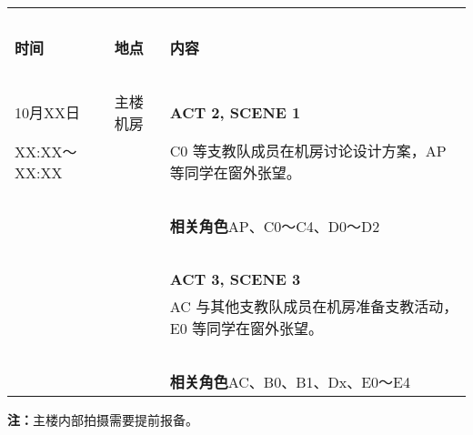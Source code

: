 \documentclass[10pt, a5paper, oneside]{memoir}
\begin{document}
\begin{table}[!ht]
    \raggedright
    \begin{tabular}{p{}p{}p{}}
        \toprule
        ~ & & \\[-0.7em]
        \textbf{时间} & \textbf{地点} & \textbf{内容} \\[0.3em]
        \midrule
        ~ & & \\[-0.7em]
        10月XX日        & 主楼机房 & \textbf{ACT 2, SCENE 1} \\[0.3em]
        XX:XX～XX:XX    & ~ & 
            C0 等支教队成员在机房讨论设计方案，AP 等同学在窗外张望。 
        \\
        ~ & & \\[-0.7em]
        ~ & ~ & \textbf{相关角色\quad}AP、C0～C4、D0～D2 \\[0.3em]
        ~ & & \\[-0.7em]
        ~ & ~ & \textbf{ACT 3, SCENE 3} \\[0.3em]
        ~ & ~ & 
            AC 与其他支教队成员在机房准备支教活动，E0 等同学在窗外张望。
        \\
        ~ & & \\[-0.7em]
        ~ & ~ & \textbf{相关角色\quad}AC、B0、B1、Dx、E0～E4 \\[0.3em]
        \bottomrule
    \end{tabular}
\end{table}
{   \vspace{-0.7\baselineskip}
    \kai \small
    \textbf{注：}主楼内部拍摄需要提前报备。
}










\end{document}

